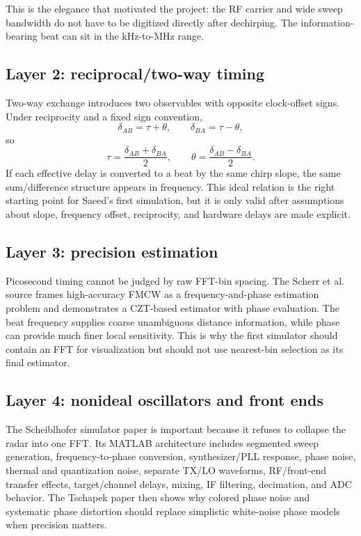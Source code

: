 \documentclass[11pt]{article}
\begin{document}
This is the elegance that motivated the project: the RF carrier and wide sweep bandwidth do not have to be digitized directly after dechirping. The information-bearing beat can sit in the kHz-to-MHz range.

\subsection{Layer 2: reciprocal/two-way timing}
Two-way exchange introduces two observables with opposite clock-offset signs. Under reciprocity and a fixed sign convention,
\[
\delta_{AB}=\tau+\theta,\qquad \delta_{BA}=\tau-\theta,
\]
so
\[
\tau=\frac{\delta_{AB}+\delta_{BA}}{2},\qquad
\theta=\frac{\delta_{AB}-\delta_{BA}}{2}.
\]
If each effective delay is converted to a beat by the same chirp slope, the same sum/difference structure appears in frequency. This ideal relation is the right starting point for Saeed's first simulation, but it is only valid after assumptions about slope, frequency offset, reciprocity, and hardware delays are made explicit.

\subsection{Layer 3: precision estimation}
Picosecond timing cannot be judged by raw FFT-bin spacing. The Scherr et al. source frames high-accuracy FMCW as a frequency-and-phase estimation problem and demonstrates a CZT-based estimator with phase evaluation. The beat frequency supplies coarse unambiguous distance information, while phase can provide much finer local sensitivity. This is why the first simulator should contain an FFT for visualization but should not use nearest-bin selection as its final estimator.

\subsection{Layer 4: nonideal oscillators and front ends}
The Scheiblhofer simulator paper is important because it refuses to collapse the radar into one FFT. Its MATLAB architecture includes segmented sweep generation, frequency-to-phase conversion, synthesizer/PLL response, phase noise, thermal and quantization noise, separate TX/LO waveforms, RF/front-end transfer effects, target/channel delays, mixing, IF filtering, decimation, and ADC behavior. The Tschapek paper then shows why colored phase noise and systematic phase distortion should replace simplistic white-noise phase models when precision matters.
\end{document}
